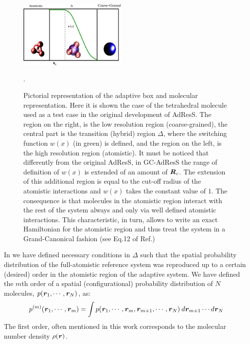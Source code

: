 \documentclass[a4paper,preprint,unsortedaddress]{revtex4-1}
\newcommand{\vect}[1]{\textbf{\textit{#1}}}
\begin{document}
\begin{figure}
\center
\includegraphics[width=0.475\textwidth]{adapt-schem.eps}
\caption{Pictorial representation of the adaptive box and
molecular representation. Here it is shown the case of the tetrahedral molecule used as a test case in the original development of AdResS. The region on the right,
is the low resolution region (coarse-grained), the central part is
the transition (hybrid) region $\Delta$, where the switching function
$w(x)$ (in green) is defined, and the region on the left, is the high resolution region (atomistic). It must be noticed that differently from the original AdResS, in GC-AdResS the range of definition of $w(x)$ is extended of an amount of ${\vect R}_{c}$. The extension of this additional region is equal to the cut-off radius of the atomistic interactions and $w(x)$ takes the constant value of $1$. The consequence is that molecules in the atomistic region interact with the rest of the system always and only via well defined atomistic interactions. This characteristic, in turn, allows to write an exact Hamiltonian for the atomistic region and thus treat the system in a Grand-Canonical fashion {(see Eq.12 of Ref.\cite{prx})}}.
\label{fig1}
\end{figure} 
In \cite{prx} we have defined necessary conditions in $\Delta$ such that the spatial probability distribution of the full-atomistic reference system was reproduced up to a certain (desired) order in the atomistic region of the adaptive system. {We have defined the $m$th order of a spatial (configurational) probability distribution of $N$ molecules, $p({\vect r}_{1}, \cdots, {\vect r}_{N})$, as:
\begin{equation}
p^{(m)}({\vect r}_{1}, \cdots, {\vect r}_{m})=\int p({\vect r}_{1}, \cdots, {\vect r}_{m},{\vect r}_{m+1}, \cdots, {\vect r}_{N}) \: d{\vect r}_{m+1}\cdots d{\vect r}_{N}
\label{order}
\end{equation}
The first order, often mentioned in this work corresponds to the molecular number density $\rho({\vect r})$.}
\end{document}
